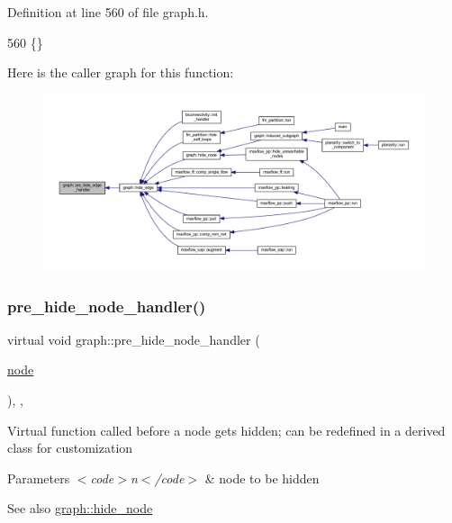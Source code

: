 Definition at line 560 of file graph.\+h.


\begin{DoxyCode}
560 \{\}          
\end{DoxyCode}
Here is the caller graph for this function\+:
\nopagebreak
\begin{figure}[H]
\begin{center}
\leavevmode
\includegraphics[width=350pt]{classgraph_aa33201befa6ad7433becd7424d6de55b_icgraph}
\end{center}
\end{figure}
\mbox{\label{classgraph_ac169b1dca0b01c97e683302b3908fd49}} 
\subsubsection{\texorpdfstring{pre\+\_\+hide\+\_\+node\+\_\+handler()}{pre\_hide\_node\_handler()}}
{\footnotesize\ttfamily virtual void graph\+::pre\+\_\+hide\+\_\+node\+\_\+handler (\begin{DoxyParamCaption}\item[{\mbox{\hyperlink{classnode}{node}}}]{ }\end{DoxyParamCaption})\hspace{0.3cm}{\ttfamily [inline]}, {\ttfamily [virtual]}, {\ttfamily [inherited]}}

Virtual function called before a node gets hidden; can be redefined in a derived class for customization


\begin{DoxyParams}{Parameters}
{\em $<$code$>$n$<$/code$>$} & node to be hidden \\
\hline
\end{DoxyParams}
\begin{DoxySeeAlso}{See also}
\mbox{\hyperlink{classgraph_a214618b5e3c02695779350532506e225}{graph\+::hide\+\_\+node}} 
\end{DoxySeeAlso}


